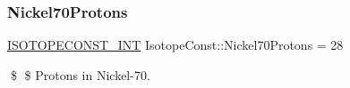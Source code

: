 \subsubsection{\texorpdfstring{Nickel70\+Protons}{Nickel70Protons}}
{\footnotesize\ttfamily \mbox{\hyperlink{group___isotope_const-_macros_ga5f18360b3e99483a35c32d789e62621c}{I\+S\+O\+T\+O\+P\+E\+C\+O\+N\+S\+T\+\_\+\+I\+NT}} Isotope\+Const\+::\+Nickel70\+Protons = 28}

\$ \$ Protons in Nickel-\/70. 